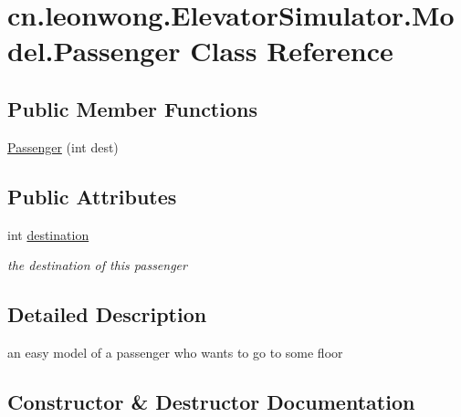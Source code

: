 \hypertarget{classcn_1_1leonwong_1_1_elevator_simulator_1_1_model_1_1_passenger}{}\section{cn.\+leonwong.\+Elevator\+Simulator.\+Model.\+Passenger Class Reference}
\label{classcn_1_1leonwong_1_1_elevator_simulator_1_1_model_1_1_passenger}
\subsection*{Public Member Functions}
\begin{DoxyCompactItemize}
\item 
\hyperlink{classcn_1_1leonwong_1_1_elevator_simulator_1_1_model_1_1_passenger_a1cf67fc003a32950fc5651965fd6e870}{Passenger} (int dest)
\end{DoxyCompactItemize}
\subsection*{Public Attributes}
\begin{DoxyCompactItemize}
\item 
\mbox{\label{classcn_1_1leonwong_1_1_elevator_simulator_1_1_model_1_1_passenger_aedd16227b36632abd3c74bb311993847}} 
int \hyperlink{classcn_1_1leonwong_1_1_elevator_simulator_1_1_model_1_1_passenger_aedd16227b36632abd3c74bb311993847}{destination}
\begin{DoxyCompactList}\small\item\em the destination of this passenger \end{DoxyCompactList}\end{DoxyCompactItemize}


\subsection{Detailed Description}
an easy model of a passenger who wants to go to some floor 

\subsection{Constructor \& Destructor Documentation}
\mbox{\label{classcn_1_1leonwong_1_1_elevator_simulator_1_1_model_1_1_passenger_a1cf67fc003a32950fc5651965fd6e870}} 
